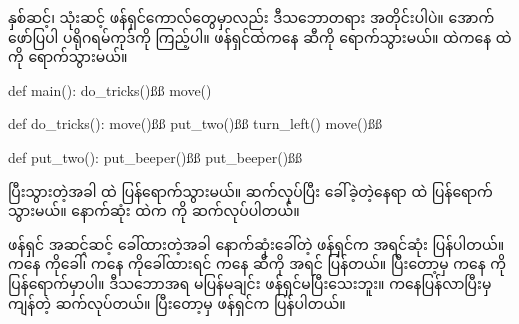နှစ်ဆင့်၊ သုံးဆင့် ဖန်ရှင်ကောလ်တွေမှာလည်း ဒီသဘောတရား အတိုင်းပါပဲ။ အောက်ဖော်ပြပါ ပရိုဂရမ်ကုဒ်ကို ကြည့်ပါ။  ဖန်ရှင်ထဲကနေ  ဆီကို ရောက်သွားမယ်။  ထဲကနေ  ထဲကို ရောက်သွားမယ်။ 
%
\begin{py}
def main():
    do_tricks()ßß
    move()

def do_tricks():
    move()ßß
    put_two()ßß
    turn_left()
    move()ßß

def put_two():
    put_beeper()ßß
    put_beeper()ßß
\end{py}
%
%

 ပြီးသွားတဲ့အခါ  ထဲ ပြန်ရောက်သွားမယ်။ \fEn{,}  ဆက်လုပ်ပြီး  ခေါ်ခဲ့တဲ့နေရာ  ထဲ ပြန်ရောက်သွားမယ်။ နောက်ဆုံး  ထဲက   ကို ဆက်လုပ်ပါတယ်။

ဖန်ရှင် အဆင့်ဆင့် ခေါ်ထားတဲ့အခါ နောက်ဆုံးခေါ်တဲ့ ဖန်ရှင်က အရင်ဆုံး  ပြန်ပါတယ်။  ကနေ  ကိုခေါ်၊  ကနေ  ကိုခေါ်ထားရင်  ကနေ  ဆီကို အရင်  ပြန်တယ်။ ပြီးတော့မှ  ကနေ  ကို ပြန်ရောက်မှာပါ။ ဒီသဘောအရ   မပြန်မချင်း  ဖန်ရှင်မပြီးသေးဘူး။  ကနေပြန်လာပြီးမှ ကျန်တဲ့ \fEn{,}  ဆက်လုပ်တယ်။ ပြီးတော့မှ  ဖန်ရှင်က  ပြန်ပါတယ်။ 


